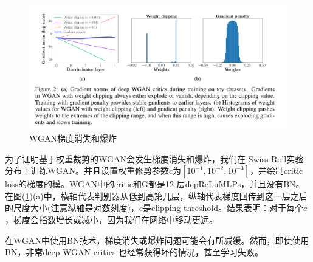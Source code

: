                \begin{figure}[H]
                \centering
                \includegraphics[width=14cm]{images/WGAN_grandient_boom.jpg}
                \caption{WGAN梯度消失和爆炸}
                \label{fig:WGAN梯度消失和爆炸}
                \end{figure}
            \par
            为了证明基于权重裁剪的WGAN会发生梯度消失和爆炸，我们在 Swiss Roll实验分布上训练WGAN。并且设置权重修剪参数$c$为$[10^{-1},10^{-2},10^{-3}]$，并绘制critic loss的梯度的模。WGAN中的critic和G都是12-层depReLuMLPs，并且没有BN。在图(\ref{fig:WGAN梯度消失和爆炸})(a)中，横轴代表判别器从低到高第几层，纵轴代表梯度回传到这一层之后的尺度大小(注意纵轴是对数刻度)，c是clipping threshold。结果表明：对于每个$c$，梯度会指数增长或减小，因为我们在网络中移动更远。
            \par
            在WGAN中使用BN技术，梯度消失或爆炸问题可能会有所减缓。然而，即使使用BN，非常deep WGAN critics 也经常获得坏的情况，甚至学习失败。
